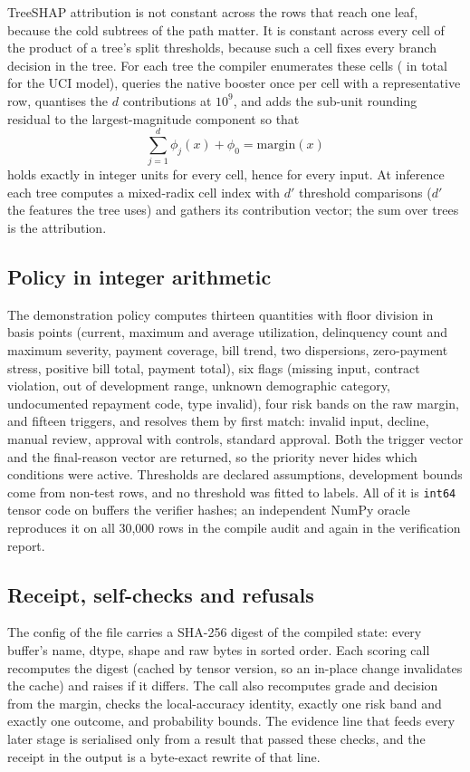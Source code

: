 \documentclass[twocolumn,10pt]{article}
\begin{document}
TreeSHAP attribution is not constant across the rows that reach one leaf, because the cold subtrees of the path matter.
It is constant across every cell of the product of a tree's split thresholds, because such a cell fixes every branch
decision in the tree. For each tree the compiler enumerates these cells (\nRegions{} in total for the UCI model),
queries the native booster once per cell with a representative row, quantises the $d$ contributions at $10^{9}$, and adds
the sub-unit rounding residual to the largest-magnitude component so that
\begin{equation}
\sum_{j=1}^{d} \phi_{j}(x) + \phi_0 = \text{margin}(x)
\end{equation}
holds exactly in integer units for every cell, hence for every input. At inference each tree computes a mixed-radix cell
index with $d'$ threshold comparisons ($d'$ the features the tree uses) and gathers its contribution vector; the sum over
trees is the attribution.

\subsection{Policy in integer arithmetic}

The demonstration policy computes thirteen quantities with floor division in basis points (current, maximum and average
utilization, delinquency count and maximum severity, payment coverage, bill trend, two dispersions, zero-payment stress,
positive bill total, payment total), six flags (missing input, contract violation, out of development range, unknown
demographic category, undocumented repayment code, type invalid), four risk bands on the raw margin, and fifteen
triggers, and resolves them by first match: invalid input, decline, manual review, approval with controls, standard
approval. Both the trigger vector and the final-reason vector are returned, so the priority never hides which conditions
were active. Thresholds are declared assumptions, development bounds come from non-test rows, and no threshold was fitted
to labels. All of it is \texttt{int64} tensor code on buffers the verifier hashes; an independent NumPy oracle reproduces
it on all 30{,}000 rows in the compile audit and again in the verification report.

\subsection{Receipt, self-checks and refusals}

The config of the file carries a SHA-256 digest of the compiled state: every buffer's name, dtype, shape and raw bytes in
sorted order. Each scoring call recomputes the digest (cached by tensor version, so an in-place change invalidates the
cache) and raises if it differs. The call also recomputes grade and decision from the margin, checks the local-accuracy
identity, exactly one risk band and exactly one outcome, and probability bounds. The evidence line that feeds every later
stage is serialised only from a result that passed these checks, and the receipt in the output is a byte-exact rewrite of
that line.
\end{document}
